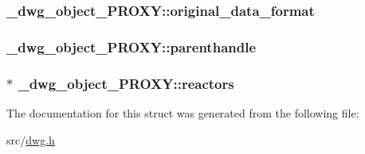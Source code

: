 \hypertarget{struct__dwg__object__PROXY_ae91fb0ed2ba451375be9e1fb4d69494c}{
\subsubsection[{original\-\_\-data\-\_\-format}]{ {\bf \-\_\-dwg\-\_\-object\-\_\-\-P\-R\-O\-X\-Y\-::original\-\_\-data\-\_\-format}}}\label{struct__dwg__object__PROXY_ae91fb0ed2ba451375be9e1fb4d69494c}
\hypertarget{struct__dwg__object__PROXY_a7cd02442560e75721dcb8aa211eef48d}{
\subsubsection[{parenthandle}]{ {\bf \-\_\-dwg\-\_\-object\-\_\-\-P\-R\-O\-X\-Y\-::parenthandle}}}\label{struct__dwg__object__PROXY_a7cd02442560e75721dcb8aa211eef48d}
\hypertarget{struct__dwg__object__PROXY_a5492567bd5c0c10175a849400a53ad97}{
\subsubsection[{reactors}]{$\ast$ {\bf \-\_\-dwg\-\_\-object\-\_\-\-P\-R\-O\-X\-Y\-::reactors}}}\label{struct__dwg__object__PROXY_a5492567bd5c0c10175a849400a53ad97}


\-The documentation for this struct was generated from the following file\-:\begin{DoxyCompactItemize}
\item 
src/\hyperlink{dwg_8h}{dwg.\-h}\end{DoxyCompactItemize}

